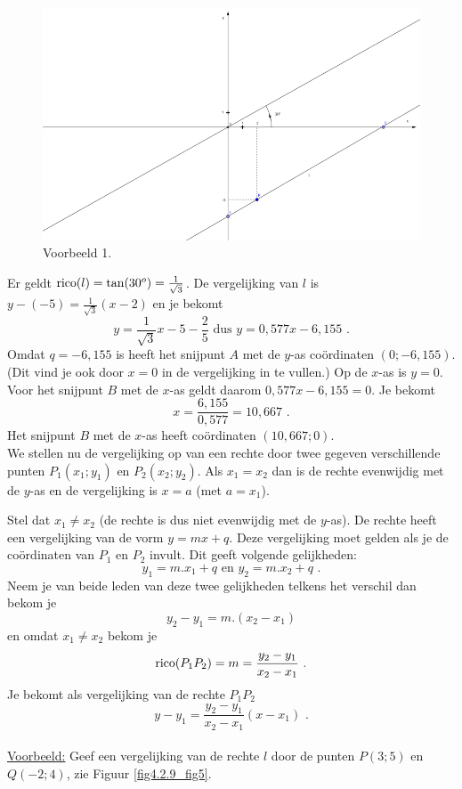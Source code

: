 \begin{figure}[!htb]
\begin{center}
\includegraphics[height=5 cm]{4_opp_inhoud_an_meetk/inputs/AMTekst4Fig4}
\caption{Voorbeeld 1.}
\label{fig4.2.9_fig4}
\end{center}
\end{figure} 

Er geldt $\operatorname{rico} (l)=\tan (30^o)=\frac {1}{\sqrt{3}}$.
De vergelijking van $l$ is $y-(-5)=\frac{1}{\sqrt{3}}(x-2)$ en je bekomt
\[
y=\frac{1}{\sqrt{3}}x-5-\frac{2}{5} \text { dus } y=0,577x-6,155 \text { .}
\]
Omdat $q=-6,155$ is heeft het snijpunt $A$ met de $y$-as co\"ordinaten $(0;-6,155)$.
(Dit vind je ook door $x=0$ in de vergelijking in te vullen.)
Op de $x$-as is $y=0$. Voor het snijpunt $B$ met de $x$-as geldt daarom $0,577x-6,155=0$.
Je bekomt
\[
x=\frac{6,155}{0,577}=10,667 \text { .}
\]
Het snijpunt $B$ met de $x$-as heeft co\"ordinaten $(10,667;0)$.\\

We stellen nu de vergelijking op van een rechte door twee gegeven verschillende punten $P_1(x_1;y_1)$ en $P_2(x_2;y_2)$.
Als $x_1=x_2$ dan is de rechte evenwijdig met de $y$-as en de vergelijking is $x=a$ (met $a=x_1$).

Stel dat $x_1 \neq x_2$ (de rechte is dus niet evenwijdig met de $y$-as).
De rechte heeft een vergelijking van de vorm $y=mx+q$.
Deze vergelijking moet gelden als je de co\"ordinaten van $P_1$ en $P_2$ invult.
Dit geeft volgende gelijkheden:
\[
y_1=m.x_1+q \text { en } y_2=m.x_2+q \text { .}
\]
Neem je van beide leden van deze twee gelijkheden telkens het verschil dan bekom je
\[
y_2-y_1=m.(x_2-x_1) 
\]
en omdat $x_1 \neq x_2$ bekom je
\[
\operatorname{rico} (P_1P_2)=m=\frac {y_2-y_1}{x_2-x_1} \text { .}
\]
Je bekomt als vergelijking van de rechte $P_1P_2$
\[
y-y_1=\frac {y_2-y_1}{x_2-x_1} (x-x_1) \text { .}
\]\\

\noindent \underline{Voorbeeld:} Geef een vergelijking van de rechte $l$ door de punten $P(3;5)$ en $Q(-2;4)$, zie Figuur \ref{fig4.2.9_fig5}.

